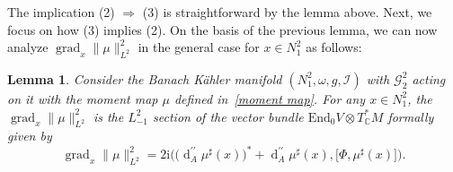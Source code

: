 \documentclass[a4paper]{amsart}
\newtheorem{lemma}[theorem]{Lemma}
\theoremstyle{definition}
\theoremstyle{remark}
\numberwithin{equation}{section}
\begin{document}
The implication (2) $\Rightarrow$ (3) is straightforward by the lemma above. Next, we focus on how (3) implies (2). On the basis of the previous lemma, we can now analyze $\operatorname{grad}_x \|\mu\|^2_{L^2}$ in the general case for $x \in N_1^2$ as follows:

\begin{lemma}
Consider the Banach K\"ahler manifold $(N_1^2, \omega, g, \mathcal{I})$ with $\mathscr{G}_2^2$ acting on it with the moment map $\mu$ defined in~\eqref{moment map}. For any $x \in N_1^2$, the $\operatorname{grad}_x \|\mu\|^2_{L^2}$ is the $L_{-1}^2$ section of the vector bundle $\mathrm{End}_0 V \otimes T_{\mathbb{C}}^* M$ formally given by
\[
\operatorname{grad}_x \|\mu\|^2_{L^2} = 2 \mathrm{i} \Big( \big( \operatorname{d}_A^{\prime\prime} \mu^\sharp(x) \big)^* + \operatorname{d}_A^{\prime\prime} \mu^\sharp(x), \big[\Phi, \mu^\sharp(x)\big] \Big).
\]
\end{lemma}
\end{document}
